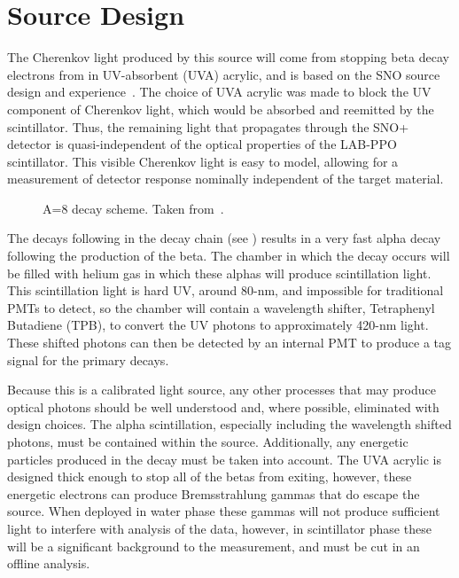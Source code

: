 \section{Source Design}
\label{chap:design}

The Cherenkov light produced by this source will come from stopping beta decay electrons from \Li in UV-absorbent (UVA) acrylic, and is based on the SNO \Li source design and experience~\cite{Tagg:2002,Tagg:2001}.
The choice of UVA acrylic was made to block the UV component of Cherenkov light, which would be absorbed and reemitted by the scintillator.
Thus, the remaining light that propagates through the SNO+ detector is quasi-independent of the optical properties of the LAB-PPO scintillator. 
This visible Cherenkov light is easy to model, allowing for a measurement of detector response nominally independent of the target material.

\begin{figure}[]
\caption{\label{fig:decayscheme} A=8 decay scheme. Taken from~\cite{Tagg:2001}.}
\end{figure}

The decays following \Li in the decay chain (see ) results in a very fast alpha decay following the production of the beta.
The chamber in which the decay occurs will be filled with helium gas in which these alphas will produce scintillation light.
This scintillation light is hard UV, around 80-nm, and impossible for traditional PMTs to detect, so the chamber will contain a wavelength shifter,  Tetraphenyl Butadiene (TPB), to convert the UV photons to approximately 420-nm light.
These shifted photons can then be detected by an internal PMT to produce a tag signal for the primary \Li decays.

Because this is a calibrated light source, any other processes that may produce optical photons should be well understood and, where possible, eliminated with design choices.
The alpha scintillation, especially including the wavelength shifted photons, must be contained within the source. 
Additionally, any energetic particles produced in the \Li decay must be taken into account.
The UVA acrylic is designed thick enough to stop all of the \Li betas from exiting, however, these energetic electrons can produce Bremsstrahlung gammas that do escape the source.
When deployed in water phase these gammas will not produce sufficient light to interfere with analysis of the data, however, in scintillator phase these will be a significant background to the measurement, and must be cut in an offline analysis. 

